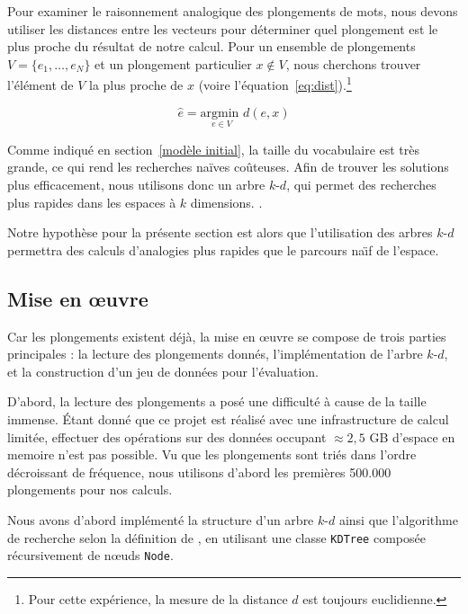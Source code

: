 \documentclass[12pt]{article}
\begin{document}
Pour examiner le raisonnement analogique des plongements de mots, nous devons utiliser les distances entre les vecteurs pour déterminer quel plongement est le plus proche du résultat de notre calcul. Pour un ensemble de plongements $V = \{e_1, \dotsc, e_N\}$ et un plongement particulier $x \notin V$, nous cherchons trouver l'élément de $ V $ la plus proche de $x$ (voire l'équation~\ref{eq:dist}).\footnote{Pour cette expérience, la mesure de la distance $d$ est toujours euclidienne.}

\begin{equation}\label{eq:dist}
    \hat{e} = \underset{e \in V}{\text{argmin }} d(e, x)
\end{equation}

Comme indiqué en section~\ref{modèle initial}, la taille du vocabulaire est très grande, ce qui rend les recherches naïves coûteuses. Afin de trouver les solutions plus efficacement, nous utilisons donc un arbre $k$-$d$, qui permet des recherches plus rapides dans les espaces à $k$ dimensions. \citep{bentley1975multidimensional}. 

Notre hypothèse pour la présente section est alors que l'utilisation des arbres $k$-$d$ permettra des calculs d'analogies plus rapides que le parcours na\"\i f de l'espace.

\subsection{Mise en œuvre} \label{mise en œuvre-2}

Car les plongements existent déjà, la mise en œuvre se compose de trois parties principales : la lecture des plongements donnés, l'implémentation de l'arbre $k$-$d$, et la construction d'un jeu de données pour l'évaluation.

D'abord, la lecture des plongements a posé une difficulté à cause de la taille immense. Étant donné que ce projet est réalisé avec une infrastructure de calcul limitée, effectuer des opérations sur des données occupant $\approx 2{,}5$ GB d'espace en memoire n'est pas possible. Vu que les plongements sont triés dans l'ordre décroissant de fréquence, nous utilisons d'abord les premières 500.000 plongements pour nos calculs.

Nous avons d'abord implémenté la structure d'un arbre $k$-$d$ ainsi que l'algorithme de recherche selon la définition de \cite{friedman1977algorithm}, en utilisant une classe \texttt{KDTree} composée récursivement de nœuds \texttt{Node}.
\end{document}
